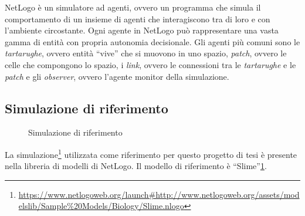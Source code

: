 NetLogo è un simulatore ad agenti, ovvero un
programma che simula il comportamento di un insieme di agenti che interagiscono tra di loro e con
l'ambiente circostante. Ogni agente in NetLogo può rappresentare una vasta gamma di entità con propria autonomia
decisionale. Gli agenti più comuni sono le \textit{tartarughe}, ovvero entità ``vive'' che si muovono in uno spazio,
\textit{patch}, ovvero le celle che compongono lo spazio, i \textit{link}, ovvero le connessioni tra le \textit{tartarughe} e 
le \textit{patch} e gli \textit{observer}, ovvero l'agente monitor della simulazione.

\subsection{Simulazione di riferimento}\label{refSim}
\begin{figure}[ht]
    \centering
    \caption{Simulazione di riferimento}\label{fig:refsimfoto}
\end{figure}
La simulazione\footnote{\url{https://www.netlogoweb.org/launch\#http://www.netlogoweb.org/assets/modelslib/Sample\%20Models/Biology/Slime.nlogo}}
utilizzata come riferimento per questo progetto di tesi è presente nella libreria
di modelli di NetLogo. Il modello di riferimento è ``Slime''\space\cite{wilensky1997netlogo}\space\cref{fig:refsimfoto}.
